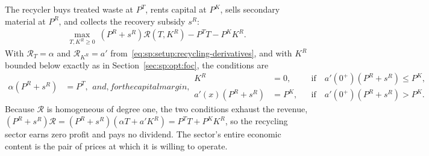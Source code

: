  The recycler buys treated waste at $P^T$, rents capital at $P^K$, sells
secondary material at $P^R$, and collects the recovery subsidy $s^R$:
\begin{align}
\max_{T,K^R\ge0}\ \left(P^R+s^R\right)\mathcal R\!\left(T,K^R\right)-P^TT-P^KK^R .
\label{eq:mkt:recycler-problem}
\end{align}
With $\mathcal R_T=\alpha$ and $\mathcal R_{K^R}=a'$ from~\eqref{eq:sp:setup:recycling-derivatives},
and with $K^R$ bounded below exactly as in Section~\ref{sec:sp:opt:foc}, the conditions are
\begin{subequations}
\label{eq:mkt:recycler-foc}
\begin{align}
\alpha\left(P^R+s^R\right) &= P^T,
\label{eq:mkt:recycler-T}
\end{align}
and, for the capital margin,
\begin{align}
K^R &= 0,
&&\text{if}\quad a'\!\left(0^{+}\right)\left(P^R+s^R\right)\le P^K,
\label{eq:mkt:recycler-K-corner}
\\
a'\!\left(x\right)\left(P^R+s^R\right) &= P^K,
&&\text{if}\quad a'\!\left(0^{+}\right)\left(P^R+s^R\right)> P^K .
\label{eq:mkt:recycler-K-interior}
\end{align}
\end{subequations}
Because $\mathcal R$ is homogeneous of degree one, the two conditions exhaust the revenue,
$\left(P^R+s^R\right)\mathcal R=\left(P^R+s^R\right)\left(\alpha T+a'K^R\right)=P^TT+P^KK^R$, so the
recycling sector earns zero profit and pays no dividend. The sector's entire economic content is the
pair of prices at which it is willing to operate.

